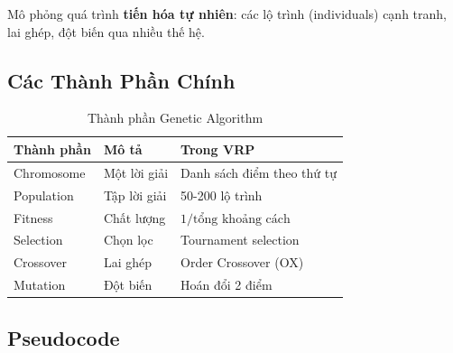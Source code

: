 \documentclass[12pt,a4paper,openany,oneside]{report}
\begin{document}
Mô phỏng quá trình \textbf{tiến hóa tự nhiên}: các lộ trình (individuals) cạnh tranh, lai ghép, đột biến qua nhiều thế hệ.

\subsection{Các Thành Phần Chính}

\begin{table}[h]
\centering
\caption{Thành phần Genetic Algorithm}
\begin{tabular}{@{}lll@{}}
\toprule
\textbf{Thành phần} & \textbf{Mô tả} & \textbf{Trong VRP} \\
\midrule
Chromosome & Một lời giải & Danh sách điểm theo thứ tự \\
Population & Tập lời giải & 50-200 lộ trình \\
Fitness & Chất lượng & $1 / \text{tổng khoảng cách}$ \\
Selection & Chọn lọc & Tournament selection \\
Crossover & Lai ghép & Order Crossover (OX) \\
Mutation & Đột biến & Hoán đổi 2 điểm \\
\bottomrule
\end{tabular}
\end{table}

\subsection{Pseudocode}
\end{document}

